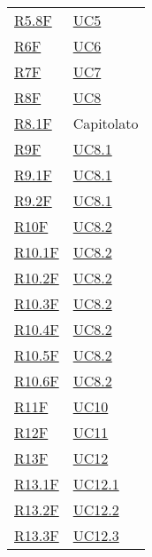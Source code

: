 \begin{center}
\begin{longtable}[!h]{p{50px} p{50px}}
        \hyperref[tab:RequisitiFunzionali]{R5.8F}    & \hyperref[sec:UC5]{UC5}       \\
        \hyperref[tab:RequisitiFunzionali]{R6F}      & \hyperref[sec:UC6]{UC6}       \\
        \hyperref[tab:RequisitiFunzionali]{R7F}      & \hyperref[sec:UC7]{UC7}       \\
        \hyperref[tab:RequisitiFunzionali]{R8F}      & \hyperref[sec:UC8]{UC8}       \\
        \hyperref[tab:RequisitiFunzionali]{R8.1F}    & Capitolato                    \\
        \hyperref[tab:RequisitiFunzionali]{R9F}      & \hyperref[sec:UC8.1]{UC8.1}   \\
        \hyperref[tab:RequisitiFunzionali]{R9.1F}    & \hyperref[sec:UC8.1]{UC8.1}   \\
        \hyperref[tab:RequisitiFunzionali]{R9.2F}    & \hyperref[sec:UC8.1]{UC8.1}   \\
        \hyperref[tab:RequisitiFunzionali]{R10F}     & \hyperref[sec:UC8.2]{UC8.2}   \\
        \hyperref[tab:RequisitiFunzionali]{R10.1F}   & \hyperref[sec:UC8.2]{UC8.2}   \\
        \hyperref[tab:RequisitiFunzionali]{R10.2F}   & \hyperref[sec:UC8.2]{UC8.2}   \\
        \hyperref[tab:RequisitiFunzionali]{R10.3F}   & \hyperref[sec:UC8.2]{UC8.2}   \\
        \hyperref[tab:RequisitiFunzionali]{R10.4F}   & \hyperref[sec:UC8.2]{UC8.2}   \\
        \hyperref[tab:RequisitiFunzionali]{R10.5F}   & \hyperref[sec:UC8.2]{UC8.2}   \\
        \hyperref[tab:RequisitiFunzionali]{R10.6F}   & \hyperref[sec:UC8.2]{UC8.2}   \\
        \hyperref[tab:RequisitiFunzionali]{R11F}     & \hyperref[sec:UC10]{UC10}     \\
        \hyperref[tab:RequisitiFunzionali]{R12F}     & \hyperref[sec:UC11]{UC11}     \\
        \hyperref[tab:RequisitiFunzionali]{R13F}     & \hyperref[sec:UC12]{UC12}     \\
        \hyperref[tab:RequisitiFunzionali]{R13.1F}   & \hyperref[sec:UC12.1]{UC12.1} \\
        \hyperref[tab:RequisitiFunzionali]{R13.2F}   & \hyperref[sec:UC12.2]{UC12.2} \\
        \hyperref[tab:RequisitiFunzionali]{R13.3F}   & \hyperref[sec:UC12.3]{UC12.3} \\

\end{longtable}
\end{center}
